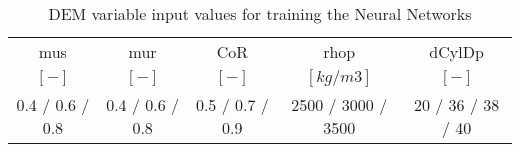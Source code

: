 \begin{table}[h]
\centering
\begin{tabular}{ccccc}
\hline
    \ac{mus} & \ac{mur} & \ac{CoR} & \ac{rhop} & \ac{dCylDp} \\
    	$[-]$  & $[-]$   & $[-]$   & $[kg/m3]$ & $[-]$ \\
    \hline
    0.4 / 0.6 / 0.8 & 0.4 / 0.6 / 0.8 & 0.5 / 0.7 / 0.9 & 2500 / 3000 / 3500 & 20 / 36 / 38 / 40 \\

\hline
\end{tabular}
\caption[DEM variable input values]{DEM variable input values for training the
Neural Networks}
\label{tab:10DEMVariableinputvalues}
\end{table}
